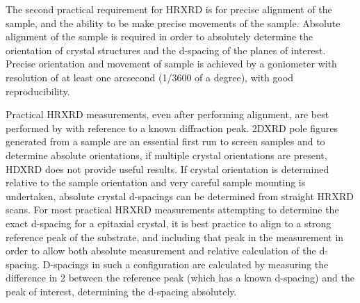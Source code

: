 The second practical requirement for HRXRD is for precise alignment of the sample, and the ability to be make precise movements of the sample.
Absolute alignment of the sample is required in order to absolutely determine the orientation of crystal structures and the d-spacing of the planes of interest.
Precise orientation and movement of sample is achieved by a goniometer with resolution of at least one arcsecond (1/3600 of a degree), with good reproducibility.

Practical HRXRD measurements, even after performing alignment, are best performed by with reference to a known diffraction peak.
2DXRD pole figures generated from a sample are an essential first run to screen samples and to determine absolute orientations, if multiple crystal orientations are present, HDXRD does not provide useful results.
If crystal orientation is determined relative to the sample orientation and very careful sample mounting is undertaken, absolute crystal d-spacings can be determined from straight HRXRD scans.
For most practical HRXRD measurements attempting to determine the exact d-spacing for a epitaxial crystal, it is best practice to align to a strong reference peak of the substrate, and including that peak in the measurement in order to allow both absolute measurement and relative calculation of the d-spacing.
D-spacings in such a configuration are calculated by measuring the difference in 2\straighttheta{} between the reference peak (which has a known d-spacing) and the peak of interest, determining the d-spacing absolutely.

